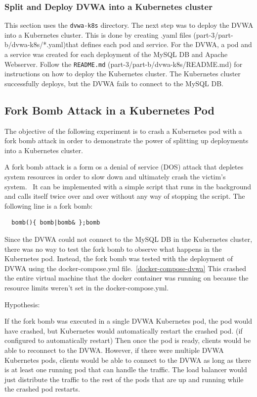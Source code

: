 \documentclass[11pt]{article}
\begin{document}
\subsubsection*{Split and Deploy DVWA into a Kubernetes cluster}
This section uses the \verb|dvwa-k8s| directory.
The next step was to deploy the DVWA into a Kubernetes cluster.
This is done by creating .yaml files (part-3/part-b/dvwa-k8s/*.yaml)that defines each pod and service.
For the DVWA, a pod and a service was created for each deployment of the MySQL DB and Apache Webserver.
Follow the \verb|README.md| (part-3/part-b/dvwa-k8s/README.md) for instructions on how to deploy the Kubernetes cluster.
The Kubernetes cluster successfully deploys, but the DVWA fails to connect to the MySQL DB.

\subsection*{Fork Bomb Attack in a Kubernetes Pod}
The objective of the following experiment is to crash a Kubernetes pod with a fork bomb attack in order to
demonstrate the power of splitting up deployments into a Kubernetes cluster.

A fork bomb attack is a form os a denial of service (DOS) attack that depletes system resources in order to slow down and ultimately crash the victim's system.~\cite{fork}
It can be implemented with a simple script that runs in the background and calls itself twice over and over without any way of stopping the script.
The following line is a fork bomb:
\begin{verbatim}
  bomb(){ bomb|bomb& };bomb
\end{verbatim}

Since the DVWA could not connect to the MySQL DB in the Kubernetes cluster, there was no way to test the fork bomb to observe what happens in the Kubernetes pod.
Instead, the fork bomb was tested with the deployment of DVWA using the docker-compose.yml file.~\ref{docker-compose-dvwa}
This crashed the entire virtual machine that the docker container was running on because the resource limits weren't set in the docker-compose.yml.

\noindent Hypothesis:

If the fork bomb was executed in a single DVWA Kubernetes pod, the pod would have crashed, but Kubernetes would automatically restart the crashed pod. (if configured to automatically restart)
Then once the pod is ready, clients would be able to reconnect to the DVWA.
However, if there were multiple DVWA Kubernetes pods, clients would be able to connect to the DVWA as long as there is at least one running pod that can handle the traffic.
The load balancer would just distribute the traffic to the rest of the pods that are up and running while the crashed pod restarts.
\end{document}

